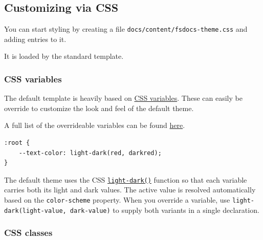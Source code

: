 \documentclass{article}
\begin{document}
\subsection*{Customizing via CSS}



You can start styling by creating a file \texttt{docs/content/fsdocs-theme.css} and adding entries to it.

It is loaded by the standard template.
\subsubsection*{CSS variables}



The default template is heavily based
on \href{https://developer.mozilla.org/en-US/docs/Web/CSS/Using\_CSS\_custom\_properties}{CSS variables}. These can easily be
override to customize the look and feel of the default theme.

A full list of the overrideable variables can be
found \href{https://github.com/fsprojects/FSharp.Formatting/blob/main/docs/content/fsdocs-default.css}{here}.
\begin{lstlisting}
:root {
    --text-color: light-dark(red, darkred);
}

\end{lstlisting}


The default theme uses the CSS \href{https://developer.mozilla.org/en-US/docs/Web/CSS/color\_value/light-dark}{\texttt{light-dark()}}
function so that each variable carries both its light and dark values.
The active value is resolved automatically based on the \texttt{color-scheme} property.
When you override a variable, use \texttt{light-dark(light-value, dark-value)} to supply both variants in a single declaration.
\subsubsection*{CSS classes}
\end{document}
